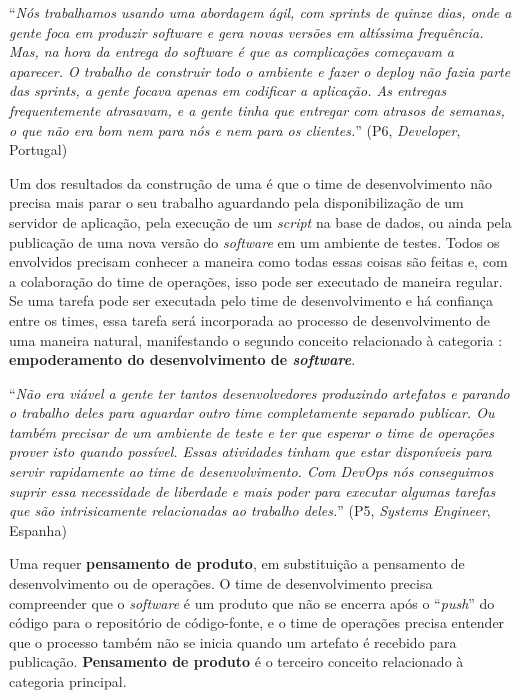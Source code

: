 \begin{mq}
``\emph{Nós trabalhamos usando uma abordagem ágil, com {\it sprints} de quinze
dias, onde a gente foca em produzir {\it software} e gera novas versões em
altíssima frequência. Mas, na hora da entrega do {\it software} é que as
complicações começavam a aparecer. O trabalho de construir todo o ambiente
e fazer o {\it deploy} não fazia parte das {\it sprints}, a gente focava apenas
em codificar a aplicação. As entregas frequentemente atrasavam,
e a gente tinha que entregar com atrasos de semanas, o que não era bom nem para
nós e nem para os clientes.}'' (P6, {\it Developer}, Portugal)
\end{mq}

Um dos resultados da construção de uma \cc é que o time de desenvolvimento não
precisa mais parar o seu trabalho aguardando pela disponibilização de um
servidor de aplicação, pela execução de um {\it script} na base de dados, ou
ainda pela publicação de uma nova versão do {\it software} em um ambiente de
testes. Todos os envolvidos precisam conhecer a maneira como todas essas coisas
são feitas e, com a colaboração do time de operações, isso pode ser executado
de maneira regular. Se uma tarefa pode ser executada pelo time de desenvolvimento
e há confiança entre os times, essa tarefa será incorporada ao processo de
desenvolvimento de uma maneira natural, manifestando o segundo conceito
relacionado à categoria \cc: {\bf empoderamento do desenvolvimento de \emph{software}}.

\begin{mq}
``\emph{Não era viável a gente ter tantos desenvolvedores produzindo artefatos e
parando o trabalho deles para aguardar outro time completamente separado
publicar. Ou também precisar de um ambiente de teste e ter que esperar o time
de operações prover isto quando possível. Essas atividades tinham que estar
disponíveis para servir rapidamente ao time de desenvolvimento. Com DevOps
nós conseguimos suprir essa necessidade de liberdade e mais poder para executar
algumas tarefas que são intrisicamente relacionadas ao trabalho deles.}''
(P5, {\it Systems Engineer}, Espanha)
\end{mq}

Uma \cc requer {\bf pensamento de produto}, em substituição a pensamento de
desenvolvimento ou de operações. O time de desenvolvimento precisa compreender
que o {\it software} é um produto que não se encerra após o ``{\it push}'' do código
para o repositório de código-fonte, e o time de operações precisa entender que
o processo também não se inicia quando um artefato é recebido para publicação.
{\bf Pensamento de produto} é o terceiro conceito relacionado à categoria
principal.

